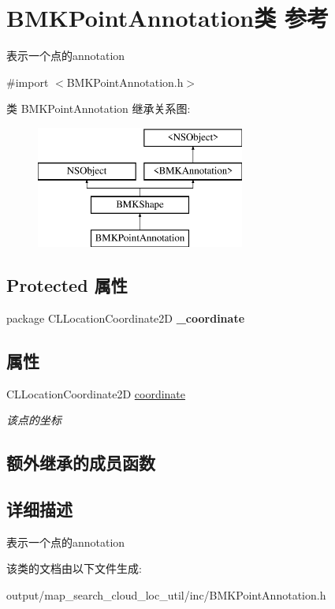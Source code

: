 \hypertarget{interface_b_m_k_point_annotation}{\section{B\+M\+K\+Point\+Annotation类 参考}
\label{interface_b_m_k_point_annotation}
}


表示一个点的annotation  




{\ttfamily \#import $<$B\+M\+K\+Point\+Annotation.\+h$>$}

类 B\+M\+K\+Point\+Annotation 继承关系图\+:\begin{figure}[H]
\begin{center}
\leavevmode
\includegraphics[height=4.000000cm]{interface_b_m_k_point_annotation}
\end{center}
\end{figure}
\subsection*{Protected 属性}
\begin{DoxyCompactItemize}
\item 
\hypertarget{interface_b_m_k_point_annotation_affd501bbf19fb485a6bd7e0e49c9a144}{package C\+L\+Location\+Coordinate2\+D {\bfseries \+\_\+coordinate}}\label{interface_b_m_k_point_annotation_affd501bbf19fb485a6bd7e0e49c9a144}

\end{DoxyCompactItemize}
\subsection*{属性}
\begin{DoxyCompactItemize}
\item 
\hypertarget{interface_b_m_k_point_annotation_a4434c998ea13f0c029eb944312611091}{C\+L\+Location\+Coordinate2\+D \hyperlink{interface_b_m_k_point_annotation_a4434c998ea13f0c029eb944312611091}{coordinate}}\label{interface_b_m_k_point_annotation_a4434c998ea13f0c029eb944312611091}

\begin{DoxyCompactList}\small\item\em 该点的坐标 \end{DoxyCompactList}\end{DoxyCompactItemize}
\subsection*{额外继承的成员函数}


\subsection{详细描述}
表示一个点的annotation 

该类的文档由以下文件生成\+:\begin{DoxyCompactItemize}
\item 
output/map\+\_\+search\+\_\+cloud\+\_\+loc\+\_\+util/inc/B\+M\+K\+Point\+Annotation.\+h\end{DoxyCompactItemize}
